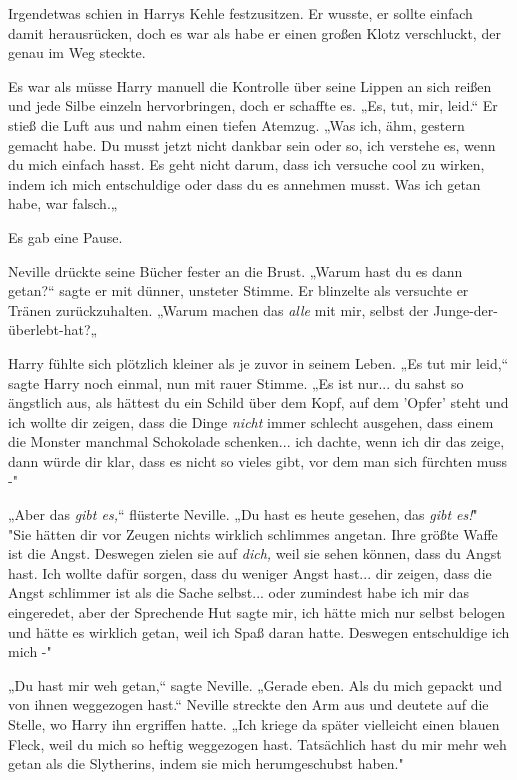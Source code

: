{Irgendetwas schien in Harrys Kehle festzusitzen. Er wusste, er sollte einfach damit herausrücken, doch es war als habe er einen großen Klotz verschluckt, der genau im Weg steckte.

Es war als müsse Harry manuell die Kontrolle über seine Lippen an sich reißen und jede Silbe einzeln hervorbringen, doch er schaffte es. „Es, tut, mir, leid.“ Er stieß die Luft aus und nahm einen tiefen Atemzug. „Was ich, ähm, gestern gemacht habe. Du musst jetzt nicht dankbar sein oder so, ich verstehe es, wenn du mich einfach hasst. Es geht nicht darum, dass ich versuche cool zu wirken, indem ich mich entschuldige oder dass du es annehmen musst. Was ich getan habe, war falsch.„

Es gab eine Pause.

Neville drückte seine Bücher fester an die Brust. „Warum hast du es dann getan?“ sagte er mit dünner, unsteter Stimme. Er blinzelte als versuchte er Tränen zurückzuhalten. „Warum machen das \emph{alle} mit mir, selbst der Junge-der-überlebt-hat?„

Harry fühlte sich plötzlich kleiner als je zuvor in seinem Leben. „Es tut mir leid,“ sagte Harry noch einmal, nun mit rauer Stimme. „Es ist nur... du sahst so ängstlich aus, als hättest du ein Schild über dem Kopf, auf dem 'Opfer' steht und ich wollte dir zeigen, dass die Dinge \emph{nicht} immer schlecht ausgehen, dass einem die Monster manchmal Schokolade schenken... ich dachte, wenn ich dir das zeige, dann würde dir klar, dass es nicht so vieles gibt, vor dem man sich fürchten muss -"

„Aber das \emph{gibt es,}“ flüsterte Neville. „Du hast es heute gesehen, das \emph{gibt es!}"\\ "Sie hätten dir vor Zeugen nichts wirklich schlimmes angetan. Ihre größte Waffe ist die Angst. Deswegen zielen sie auf \emph{dich,} weil sie sehen können, dass du Angst hast. Ich wollte dafür sorgen, dass du weniger Angst hast... dir zeigen, dass die Angst schlimmer ist als die Sache selbst... oder zumindest habe ich mir das eingeredet, aber der Sprechende Hut sagte mir, ich hätte mich nur selbst belogen und hätte es wirklich getan, weil ich Spaß daran hatte. Deswegen entschuldige ich mich -"

„Du hast mir weh getan,“ sagte Neville. „Gerade eben. Als du mich gepackt und von ihnen weggezogen hast.“ Neville streckte den Arm aus und deutete auf die Stelle, wo Harry ihn ergriffen hatte. „Ich kriege da später vielleicht einen blauen Fleck, weil du mich so heftig weggezogen hast. Tatsächlich hast du mir mehr weh getan als die Slytherins, indem sie mich herumgeschubst haben."

}
